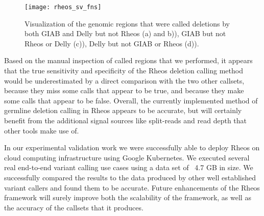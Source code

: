 \begin{figure}[h!]
    \texttt{[image: rheos\_sv\_fns]}
    \centering
    \caption {Visualization of the genomic regions that were called deletions by both GIAB and Delly but not Rheos (a) and b)), GIAB but not Rheos or Delly (c)), Delly but not GIAB or Rheos (d)).}
    \label{fig:rheos_sv_fns}
\end{figure}

Based on the manual inspection of called regions that we performed, it appears that the true sensitivity and specificity of the Rheos deletion calling method would be underestimated by a direct comparison with the two other callsets, because they miss some calls that appear to be true, and because they make some calls that appear to be false. Overall, the currently implemented method of germline deletion calling in Rheos appears to be accurate, but will certainly benefit from the additional signal sources like split-reads and read depth that other tools make use of.

In our experimental validation work we were successfully able to deploy Rheos on cloud computing infrastructure using Google Kubernetes. We executed several real end-to-end variant calling use cases using a data set of ~4.7 GB in size. We successfully compared the results to the data produced by other well established variant callers and found them to be accurate. Future enhancements of the Rheos framework will surely improve both the scalability of the framework, as well as the accuracy of the callsets that it produces.
